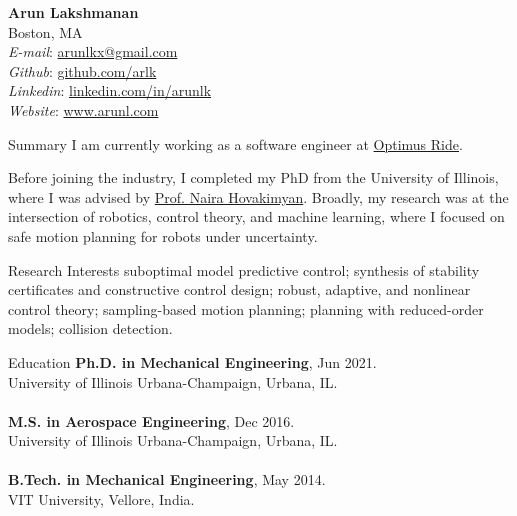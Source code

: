 \documentclass[9pt]{article}
\begin{document}
\begin{rsection}{}
\textbf{\large Arun Lakshmanan} \\
Boston, MA 
\vspace{0.5em} \\
\textit{E-mail}: \href{mailto:arunlkx@gmail.com}{arunlkx@gmail.com} \\
\textit{Github}: \href{https://github.com/arlk}{github.com/arlk} \\
\textit{Linkedin}: \href{https://www.linkedin.com/in/arunlk/}{linkedin.com/in/arunlk} \\
\textit{Website}: \href{https://www.arunl.com}{www.arunl.com} 
\end{rsection}

\begin{rsection}{Summary}
I am currently working as a software engineer at \href{https://optimusride.com}{Optimus Ride}. 

Before joining the industry, I completed my PhD from the University of Illinois, where I was advised by \href{https://naira-hovakimyan.mechse.illinois.edu/}{Prof. Naira Hovakimyan}. Broadly, my research was at the intersection of robotics, control theory, and machine learning, where I focused on safe motion planning for robots under uncertainty. 
\end{rsection}

\begin{rsection}{Research Interests}
suboptimal model predictive control; synthesis of stability certificates and constructive control design; robust, adaptive, and nonlinear control theory; sampling-based motion planning; planning with reduced-order models; collision detection.
\end{rsection}

\begin{rsection}{Education}
    \textbf{Ph.D. in Mechanical Engineering}, Jun 2021. \\
    University of Illinois Urbana-Champaign, Urbana, IL. \\ \\
    \textbf{M.S. in Aerospace Engineering}, Dec 2016. \\
    University of Illinois Urbana-Champaign, Urbana, IL. \\ \\
    \textbf{B.Tech. in Mechanical Engineering}, May 2014. \\
    VIT University, Vellore, India.
\end{rsection}
\end{document}
